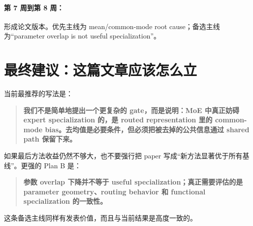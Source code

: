 \documentclass[11pt]{article}
\begin{document}
\paragraph{第 7 周到第 8 周：} 形成论文版本。优先主线为 mean/common-mode root cause；备选主线为“parameter overlap is not useful specialization”。

\section{最终建议：这篇文章应该怎么立}

当前最推荐的写法是：
\begin{quote}
\textbf{我们不是简单地提出一个更复杂的 gate，而是说明：MoE 中真正妨碍 expert specialization 的，是 routed representation 里的 common-mode bias。去均值是必要条件，但必须把被去掉的公共信息通过 shared path 保留下来。}
\end{quote}

如果最后方法收益仍然不够大，也不要强行把 paper 写成“新方法显著优于所有基线”。更强的 Plan B 是：
\begin{quote}
\textbf{参数 overlap 下降并不等于 useful specialization；真正需要评估的是 parameter geometry、routing behavior 和 functional specialization 的一致性。}
\end{quote}

这条备选主线同样有发表价值，而且与当前结果是高度一致的。
\end{document}
